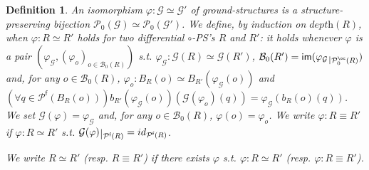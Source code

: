 \documentclass{article}
\theoremstyle{plain}
\newtheorem{definition}{Definition}
\newcommand{\groundof}[1]{\mathcal{G}(#1)}
\newcommand{\depthof}[1]{\textit{depth}(#1)}
\def\restriction#1#2{\mathchoice
              {\setbox1\hbox{${\displaystyle #1}_{\scriptstyle #2}$}
              \restrictionaux{#1}{#2}}
              {\setbox1\hbox{${\textstyle #1}_{\scriptstyle #2}$}
              \restrictionaux{#1}{#2}}
              {\setbox1\hbox{${\scriptstyle #1}_{\scriptscriptstyle #2}$}
              \restrictionaux{#1}{#2}}
              {\setbox1\hbox{${\scriptscriptstyle #1}_{\scriptscriptstyle #2}$}
              \restrictionaux{#1}{#2}}}
\def\restrictionaux#1#2{{#1\,\smash{\vrule height .8\ht1 depth .85\dp1}}_{\,#2}}
\newcommand{\im}[1]{\textsf{im}(#1)}
\newcommand{\cod}{\oc}
\newcommand{\portsatzero}[1]{\mathcal{P}_0(#1)}
\newcommand{\conclusions}[1]{\mathcal{P}^{\textsf{f}}(#1)}
\newcommand{\portsatzerooftype}[2]{\mathcal{P}_0^{#1}(#2)}
\newcommand{\boxesatzero}[1]{\mathcal{B}_{0}(#1)}
\begin{document}
\begin{definition}
An \emph{isomorphism $\varphi: \mathcal{G} \simeq \mathcal{G'}$ of ground-structures} is a structure-preserving bijection $\portsatzero{\mathcal{G}} \simeq \portsatzero{\mathcal{G'}}$. We define, by induction on $\depthof{R}$, when $\varphi : R \simeq R'$ holds for two differential $\circ$-PS's $R$ and $R'$: it holds whenever $\varphi$ is a pair $(\varphi_\mathcal{G}, (\varphi_o)_{o \in \boxesatzero{R}})$ s.t. $\varphi_\mathcal{G} : \groundof{R} \simeq \groundof{R'}$, $\boxesatzero{R'} = \im{\restriction{\varphi_{\mathcal{G}}}{\portsatzerooftype{\cod}{R}}}$ and, 
for any $o \in \boxesatzero{R}$, 
$\varphi_o: B_R(o) \simeq B_{R'}(\varphi_\mathcal{G}(o))$ and $(\forall q \in \conclusions{B_R(o)}) b_{R'}(\varphi_{\mathcal{G}}(o))(\groundof{\varphi_o}(q)) = \varphi_{\mathcal{G}}(b_R(o)(q))$. 
We set $\groundof{\varphi} = \varphi_\mathcal{G}$ and, for any $o \in \boxesatzero{R}$, $\varphi(o) = \varphi_o$. 
We write $\varphi: R \equiv R'$ if $\varphi : R \simeq R'$ s.t. $\restriction{\groundof{\varphi}}{\conclusions{R}} = id_{\conclusions{R}}$.

We write $R \simeq R'$ (resp. $R \equiv R'$) if there exists $\varphi$ s.t. $\varphi : R \simeq R'$ (resp. $\varphi: R \equiv R'$).
\end{definition}
\end{document}

